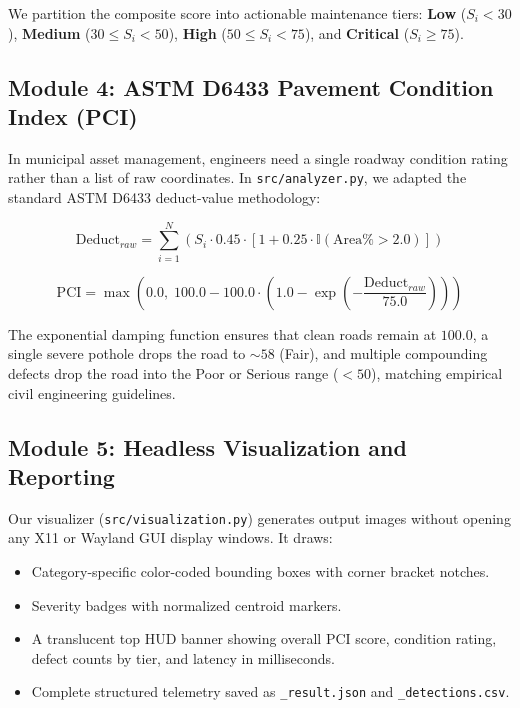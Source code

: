 \documentclass[11pt,a4paper]{article}
\begin{document}
We partition the composite score into actionable maintenance tiers: \textbf{Low} ($S_i < 30$), \textbf{Medium} ($30 \le S_i < 50$), \textbf{High} ($50 \le S_i < 75$), and \textbf{Critical} ($S_i \ge 75$).

\subsection{Module 4: ASTM D6433 Pavement Condition Index (PCI)}
In municipal asset management, engineers need a single roadway condition rating rather than a list of raw coordinates. In \texttt{src/analyzer.py}, we adapted the standard ASTM D6433 deduct-value methodology:

\begin{equation}
\text{Deduct}_{raw} = \sum_{i=1}^{N} \left(S_i \cdot 0.45 \cdot \left[1 + 0.25 \cdot \mathbb{I}(\text{Area}\% > 2.0)\right]\right)
\end{equation}

\begin{equation}
\text{PCI} = \max\left(0.0, \; 100.0 - 100.0 \cdot \left(1.0 - \exp\left(-\frac{\text{Deduct}_{raw}}{75.0}\right)\right)\right)
\end{equation}

The exponential damping function ensures that clean roads remain at $100.0$, a single severe pothole drops the road to $\sim 58$ (Fair), and multiple compounding defects drop the road into the Poor or Serious range ($<50$), matching empirical civil engineering guidelines.

\subsection{Module 5: Headless Visualization and Reporting}
Our visualizer (\texttt{src/visualization.py}) generates output images without opening any X11 or Wayland GUI display windows. It draws:
\begin{itemize}[noitemsep]
    \item Category-specific color-coded bounding boxes with corner bracket notches.
    \item Severity badges with normalized centroid markers.
    \item A translucent top HUD banner showing overall PCI score, condition rating, defect counts by tier, and latency in milliseconds.
    \item Complete structured telemetry saved as \texttt{\_result.json} and \texttt{\_detections.csv}.
\end{itemize}
\end{document}
